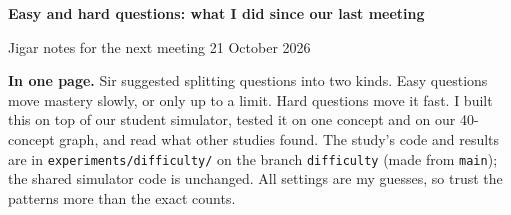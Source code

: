 \documentclass[11pt,a4paper]{article}
\newcommand{\keybox}[1]{\par\noindent\colorbox{boxc}{\parbox{\dimexpr\linewidth-2\fboxsep}{#1}}\par}
\begin{document}
{\LARGE\bfseries Easy and hard questions: what I did since our last meeting}\par\vspace{3pt}
{\large Jigar \textbullet{} notes for the next meeting \textbullet{} 21 October 2026}\par
\vspace{8pt}

\keybox{\textbf{In one page.}
Sir suggested splitting questions into two kinds. Easy questions move mastery slowly, or only up to a limit. Hard questions move it fast. I built this on top of our student simulator, tested it on one concept and on our 40-concept graph, and read what other studies found. The study's code and results are in \texttt{experiments/difficulty/} on the branch \texttt{difficulty} (made from \texttt{main}); the shared simulator code is unchanged. All settings are my guesses, so trust the patterns more than the exact counts.

}
\end{document}

